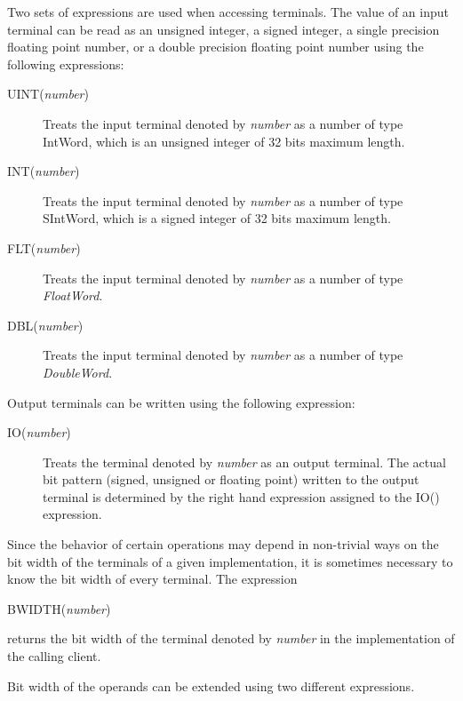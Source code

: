 \documentclass[twoside]{tceusermanual}
\begin{document}
Two sets of expressions are used when accessing terminals. The value of
an input terminal
can be read as an unsigned integer, a signed integer, a single precision 
floating point number, or
a double precision floating point number using the following expressions:
\begin{description}
\item[UINT(\emph{number})] %
  Treats the input terminal denoted by \emph{number} as a number of type
  IntWord, which is an unsigned integer of 32 bits maximum length.
\item[INT(\emph{number})] %
  Treats the input terminal denoted by \emph{number} as a number of type
  SIntWord, which is a signed integer of 32 bits maximum length.
\item[FLT(\emph{number})] %
  Treats the input terminal denoted by \emph{number} as a number of type
  \emph{FloatWord}.
\item[DBL(\emph{number})] %
  Treats the input terminal denoted by \emph{number} as a number of type
  \emph{DoubleWord}.
\end{description}

Output terminals can be written using the following expression:
\begin{description}
\item[IO(\emph{number})] %
   Treats the terminal denoted by \emph{number} as an output terminal.
   The actual bit pattern (signed, unsigned or floating point) written to
   the output terminal is determined by the right hand expression
   assigned to the IO() expression.
\end{description}

Since the behavior of certain operations may depend in non-trivial ways on
the bit width of the terminals of a given implementation, it is sometimes
necessary to know the bit width of every terminal.  The expression
\begin{description}
\item[BWIDTH(\emph{number})]
\end{description}
returns the bit width of the terminal denoted by \emph{number} in the
implementation of the calling client.

Bit width of the operands can be extended using two different expressions.
\end{document}
